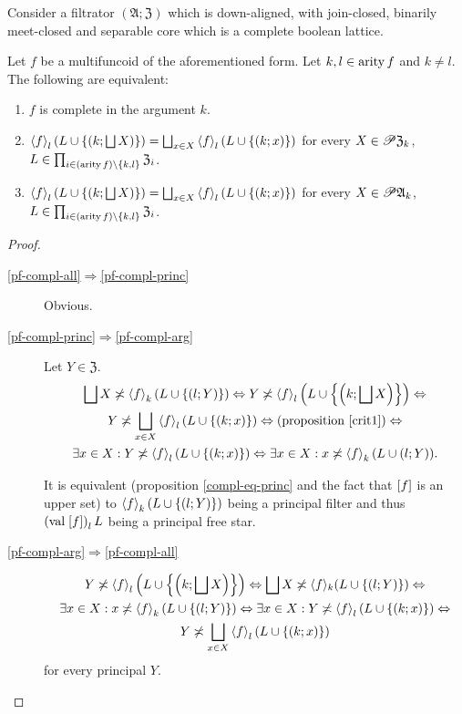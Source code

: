 \begin{thm}
\label{mfunc-compl-k}Consider a filtrator $(\mathfrak{A};\mathfrak{Z})$
which is down-aligned, with join-closed, binarily meet-closed and
separable core which is a complete boolean lattice.

Let $f$ be a multifuncoid of the aforementioned form. Let $k,l\in\operatorname{arity} f$
and $k\neq l$. The following are equivalent: 
\begin{enumerate}
\item \label{pf-compl-arg}$f$ is complete in the argument $k$.
\item \label{pf-compl-princ}$\left\langle f\right\rangle_{l}\left(L\cup\left\{ \left(k;\bigsqcup X\right)\right\} \right)=\bigsqcup_{x\in X}\left\langle f\right\rangle_{l}(L\cup\{(k;x)\})$
for every $X\in\mathscr{P}\mathfrak{Z}_{k}$, $L\in\prod_{i\in(\operatorname{arity} f)\setminus\{k,l\}}\mathfrak{Z}_{i}$.
\item \label{pf-compl-all}$\left\langle f\right\rangle_{l}\left(L\cup\left\{ \left(k;\bigsqcup X\right)\right\} \right)=\bigsqcup_{x\in X}\left\langle f\right\rangle_{l}(L\cup\{(k;x)\})$
for every $X\in\mathscr{P}\mathfrak{A}_{k}$, $L\in\prod_{i\in(\operatorname{arity} f)\setminus\{k,l\}}\mathfrak{Z}_{i}$.
\end{enumerate}
\end{thm}
\begin{proof}
~
\begin{description}
\item [{\ref{pf-compl-all}$\Rightarrow$\ref{pf-compl-princ}}] Obvious.
\item [{\ref{pf-compl-princ}$\Rightarrow$\ref{pf-compl-arg}}] Let $Y\in\mathfrak{Z}$.
\begin{multline*}
\bigsqcup X\not\asymp\left\langle f\right\rangle_{k}(L\cup\{(l;Y)\})\Leftrightarrow Y\not\asymp\left\langle f\right\rangle_{l}\left(L\cup\left\{ \left(k;\bigsqcup X\right)\right\} \right)\Leftrightarrow\\
Y\not\asymp\bigsqcup_{x\in X}\left\langle f\right\rangle_{l}(L\cup\{(k;x)\})\Leftrightarrow\text{(proposition \ref{crit1})}\Leftrightarrow\\
\exists x\in X:Y\not\asymp\left\langle f\right\rangle_{l}(L\cup\{(k;x)\})\Leftrightarrow\exists x\in X:x\not\asymp\left\langle f\right\rangle_{k}(L\cup(l;Y)).
\end{multline*}



It is equivalent (proposition \ref{compl-eq-princ} and the fact that
$\mathrel{\left[f\right]}$ is an upper set) to $\left\langle f\right\rangle_{k}(L\cup\{(l;Y)\})$
being a principal filter and thus $\left(\operatorname{val}\mathrel{\left[f\right]}\right)_{l}L$
being a principal free star.

\item [{\ref{pf-compl-arg}$\Rightarrow$\ref{pf-compl-all}}] 
\begin{multline*}
Y\not\asymp\left\langle f\right\rangle_{l}\left(L\cup\left\{ \left(k;\bigsqcup X\right)\right\} \right)\Leftrightarrow\bigsqcup X\not\asymp\langle f\rangle_{k}(L\cup\{(l;Y)\})\Leftrightarrow\\
\exists x\in X:x\not\asymp\left\langle f\right\rangle_{k}(L\cup\{(l;Y)\})\Leftrightarrow\exists x\in X:Y\not\asymp\left\langle f\right\rangle_{l}(L\cup\{(k;x)\})\Leftrightarrow\\
Y\not\asymp\bigsqcup_{x\in X}\left\langle f\right\rangle_{l}(L\cup\{(k;x)\})
\end{multline*}
for every principal $Y$.
\end{description}
\end{proof}


